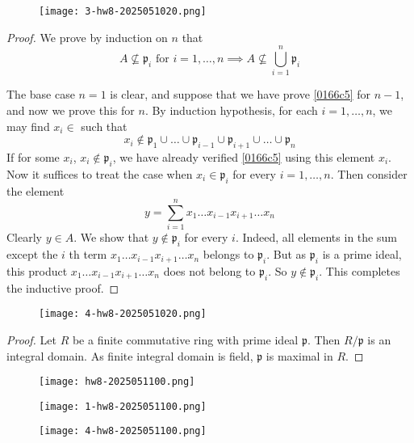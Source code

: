 \begin{exercise}
\begin{figure}[H]
\centering
\texttt{[image: 3-hw8-2025051020.png]}
\label{}
\end{figure}
\end{exercise}
\begin{proof}
We prove by induction on $n$ that
\begin{equation}
A\not\subseteq \mathfrak{p}_i\text{ for }i=1,\dots,n\implies A\not\subseteq \bigcup_{i=1}^{n} \mathfrak{p}_i
\label{0166c5}
\end{equation}

The base case $n=1$ is clear, and suppose that we have prove \cref{0166c5} for $n-1$, and now we prove this for $n$. By induction hypothesis, for each $i=1,\dots,n$, we may find $x_i\in $ such that
\[
x_i\not\in \mathfrak{p}_{1}\cup\dots \cup \mathfrak{p}_{i-1}\cup \mathfrak{p}_{i+1}\cup\dots \cup \mathfrak{p}_n
\]
If for some $x_i$, $x_i \not\in \mathfrak{p}_i$, we have already verified \cref{0166c5} using this element $x_i$. Now it suffices to treat the case when $x_i\in \mathfrak{p}_i$ for every $i=1,\dots,n$. Then consider the element
\[
y=\sum_{i=1}^{n} x_1\dots x_{i-1}x_{i+1}\dots x_n
\]
Clearly $y\in A$. We show that $y\not\in \mathfrak{p}_i$ for every $i$. Indeed, all elements in the sum except the $i$ th term $x_1\dots x_{i-1}x_{i+1}\dots x_n$ belongs to $\mathfrak{p}_i$. But as $\mathfrak{p}_i$ is a prime ideal, this product $x_1\dots x_{i-1}x_{i+1}\dots x_n$ does not belong to $\mathfrak{p}_i$. So $y\not\in \mathfrak{p}_i$. This completes the inductive proof.
\end{proof}

\begin{exercise}
\begin{figure}[H]
\centering
\texttt{[image: 4-hw8-2025051020.png]}
\label{}
\end{figure}
\end{exercise}
\begin{proof}
Let $R$ be a finite commutative ring with prime ideal $\mathfrak{p}$. Then $R/\mathfrak{p}$ is an integral domain. As finite integral domain is field, $\mathfrak{p}$ is maximal in $R$.
\end{proof}
\begin{figure}[H]
\centering
\texttt{[image: hw8-2025051100.png]}
\label{}
\end{figure}
\begin{figure}[H]
\centering
\texttt{[image: 1-hw8-2025051100.png]}
\label{}
\end{figure}
\begin{figure}[H]
\centering
\texttt{[image: 4-hw8-2025051100.png]}
\label{}
\end{figure}

